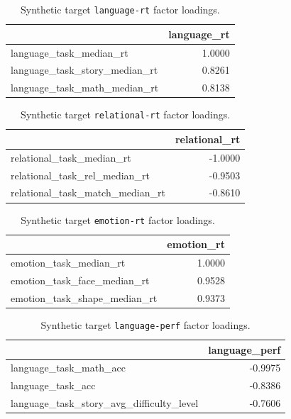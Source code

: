 \documentclass{article}
\begin{document}
\begin{table}[H]
\centering
\begin{tabular}{lr}
\toprule
 & language\_rt \\
\midrule
language\_task\_median\_rt & 1.0000 \\
language\_task\_story\_median\_rt & 0.8261 \\
language\_task\_math\_median\_rt & 0.8138 \\
\bottomrule
\end{tabular}

\footnotesize
\caption{Synthetic target \texttt{language-rt} factor loadings.}
\normalsize
\label{tab:language-rt}
\end{table}


\begin{table}[H]
\centering
\begin{tabular}{lr}
\toprule
 & relational\_rt \\
\midrule
relational\_task\_median\_rt & -1.0000 \\
relational\_task\_rel\_median\_rt & -0.9503 \\
relational\_task\_match\_median\_rt & -0.8610 \\
\bottomrule
\end{tabular}

\footnotesize
\caption{Synthetic target \texttt{relational-rt} factor loadings.}
\normalsize
\label{tab:relational-rt}
\end{table}


\begin{table}[H]
\centering
\begin{tabular}{lr}
\toprule
 & emotion\_rt \\
\midrule
emotion\_task\_median\_rt & 1.0000 \\
emotion\_task\_face\_median\_rt & 0.9528 \\
emotion\_task\_shape\_median\_rt & 0.9373 \\
\bottomrule
\end{tabular}

\footnotesize
\caption{Synthetic target \texttt{emotion-rt} factor loadings.}
\normalsize
\label{tab:emotion-rt}
\end{table}


\begin{table}[H]
\centering
\begin{tabular}{lr}
\toprule
 & language\_perf \\
\midrule
language\_task\_math\_acc & -0.9975 \\
language\_task\_acc & -0.8386 \\
language\_task\_story\_avg\_difficulty\_level & -0.7606 \\
\bottomrule
\end{tabular}

\footnotesize
\caption{Synthetic target \texttt{language-perf} factor loadings.}
\normalsize
\label{tab:language-perf}
\end{table}
\end{document}
